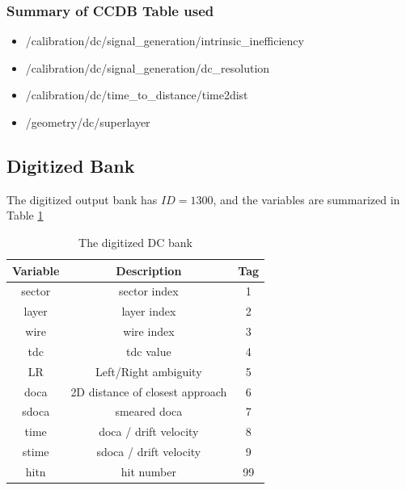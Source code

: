\subsubsection{Summary of CCDB Table used}
\begin{itemize}
	\item /calibration/dc/signal\_generation/intrinsic\_inefficiency
	\item /calibration/dc/signal\_generation/dc\_resolution
	\item /calibration/dc/time\_to\_distance/time2dist
	\item /geometry/dc/superlayer
\end{itemize}


\subsection{Digitized Bank}

The digitized output bank has $ID=1300$, and the variables are summarized in Table \ref{tab:dcBank}

\begin{table}[h]
	\begin{center}
		\begin{tabular}{| c | c | c |}
			\hline \hline
			Variable         & Description  & Tag  \\
			\hline
               sector  &                                      sector index  &    1   \\
                layer  &                                       layer index  &    2   \\
                 wire  &                                        wire index  &    3   \\
                  tdc  &                                         tdc value  &    4   \\
                   LR  & Left/Right ambiguity                               &    5   \\
                 doca  & 2D distance of closest approach                    &    6   \\
                sdoca  &                                      smeared doca  &    7   \\
                 time  &              doca / drift velocity                 &    8   \\
                stime  &             sdoca / drift velocity                 &    9   \\
                 hitn  &                                        hit number  &   99   \\
			\hline \hline
		\end{tabular}
	\end{center}
	\caption{The digitized DC bank}\label{tab:dcBank}
\end{table}


